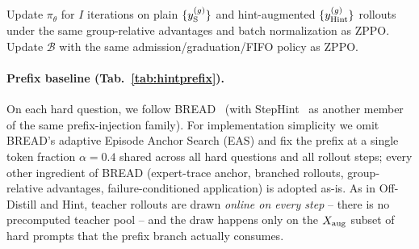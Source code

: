 \begin{algorithm*}[!htbp]
{{    }
}
Update $\pi_\theta$ for $I$ iterations on plain $\{y_{\rm S}^{(g)}\}$ and hint-augmented $\{y_{\rm Hint}^{(g)}\}$ rollouts under the same group-relative advantages and batch normalization as ZPPO.\;
Update $\mathcal{B}$ with the same admission/graduation/FIFO policy as ZPPO.\;
\caption{Hint training step. Each step is tagged with the Guide-GRPO~\citep{nath2025adaptive} (A1--A4) and SEELE~\citep{li2025staying} (B1--B3) component it inherits. Teacher rollouts are drawn \emph{online on this step}, on the $X_{\rm aug}$ subset only, with no precomputed pool. Hint augmentation requires a correct teacher rollout at this step; hard questions without one (i.e.\ teacher fails on all $G_{\rm T}$ rollouts) fall back to the plain student rollout only.}
\label{alg:hint}
\end{algorithm*}

\paragraph{Prefix baseline (Tab.~\ref{tab:hintprefix}).}
On each hard question, we follow BREAD~\citep{zhang2025bread} (with StepHint~\citep{zhang2025stephint} as another member of the same prefix-injection family). For implementation simplicity we omit BREAD's adaptive Episode Anchor Search (EAS) and fix the prefix at a single token fraction $\alpha\!=\!0.4$ shared across all hard questions and all rollout steps; every other ingredient of BREAD (expert-trace anchor, branched rollouts, group-relative advantages, failure-conditioned application) is adopted as-is. As in Off-Distill and Hint, teacher rollouts are drawn \emph{online on every step} -- there is no precomputed teacher pool -- and the draw happens only on the $X_{\rm aug}$ subset of hard prompts that the prefix branch actually consumes.

